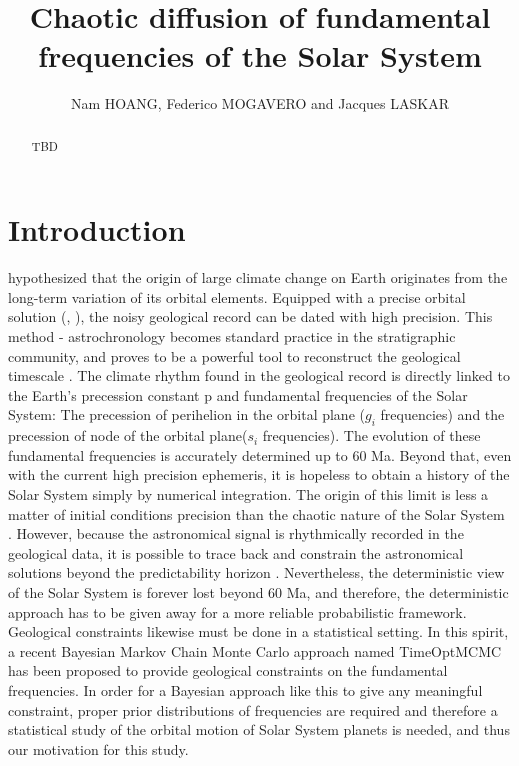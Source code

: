 \documentclass{article}
\begin{document}
\title{Chaotic diffusion of fundamental frequencies of the Solar System }


\author{Nam HOANG, Federico MOGAVERO and Jacques LASKAR}

\maketitle

\begin{abstract}
   TBD
\end{abstract}



\section{Introduction}

\cite{milankovitch1941canon} hypothesized that the origin of large climate change on Earth originates from the long-term variation of its orbital elements. 
Equipped with a precise orbital solution (\citealt{laskar2004}, \citealt{laskar2010}), the noisy geological record can be dated with high precision. This method - astrochronology becomes standard practice in the stratigraphic community, and proves to be a powerful tool to reconstruct the geological timescale \citep{gradstein2012}.
The climate rhythm found in the geological record is directly linked to the Earth’s precession constant p and fundamental frequencies of the Solar System: The precession of perihelion in the orbital plane ($g_i$ frequencies) and the precession of node of the orbital plane($s_i$ frequencies).  The evolution of these fundamental frequencies is accurately determined up to 60 Ma. Beyond that, even with the current high precision ephemeris, it is hopeless to obtain a  history of the Solar System simply by numerical integration. The origin of this limit is less a matter of initial conditions precision than the chaotic nature of the Solar System \citep{laskar1990}.  However, because the astronomical signal is rhythmically recorded in the geological data, it is possible to trace back and constrain the astronomical solutions beyond the predictability horizon \citep{olsen2019,ma2017}. Nevertheless, the deterministic view of the Solar System is forever lost beyond 60 Ma, and therefore, the deterministic approach has to be given away for a  more reliable probabilistic framework. Geological constraints likewise must be done in a statistical setting. In this spirit, a recent Bayesian Markov Chain Monte Carlo approach named TimeOptMCMC  \citep{meyers2018} has been proposed to provide geological constraints on the fundamental frequencies. In order for a Bayesian approach like this to give any meaningful constraint, proper prior distributions of frequencies are required and therefore a statistical study of the orbital motion of Solar System planets is needed, and thus our motivation for this study.
\end{document}
